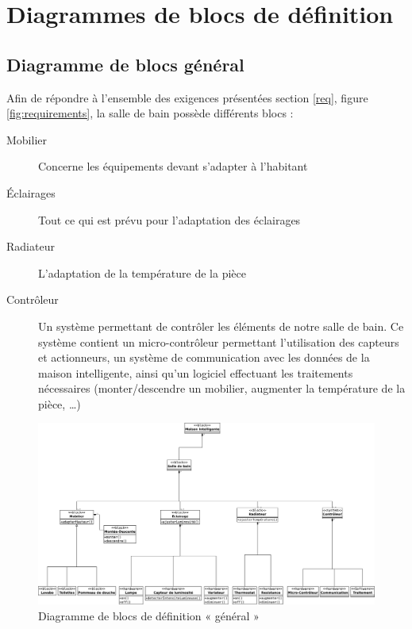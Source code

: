 \chapter{Diagrammes de blocs de définition}
\section{Diagramme de blocs général}
Afin de répondre à l'ensemble des exigences présentées section \ref{req}, figure \ref{fig:requirements}, la salle de bain possède différents blocs : 
\begin{description}
	\item[Mobilier] Concerne les équipements devant s'adapter à l'habitant
	\item[Éclairages] Tout ce qui est prévu pour l'adaptation des éclairages
	\item[Radiateur] L'adaptation de la température de la pièce
	\item[Contrôleur] Un système permettant de contrôler les éléments de notre salle de bain. Ce système contient un micro-contrôleur permettant l'utilisation des capteurs et actionneurs, un système de communication avec les données de la maison intelligente, ainsi qu'un logiciel effectuant les traitements nécessaires (monter/descendre un mobilier, augmenter la température de la pièce, \ldots)
\end{description}
\vfill

\begin{figure}[H]
	\hspace{-40px}
	\includegraphics[width=1.16\linewidth]{diagrams/bathroom/diagramme_blocks_bdd.eps}
	\caption{Diagramme de blocs de définition « général »}
	\label{fig:diagramme_bdd}
\end{figure}
\vfill
\pagebreak

